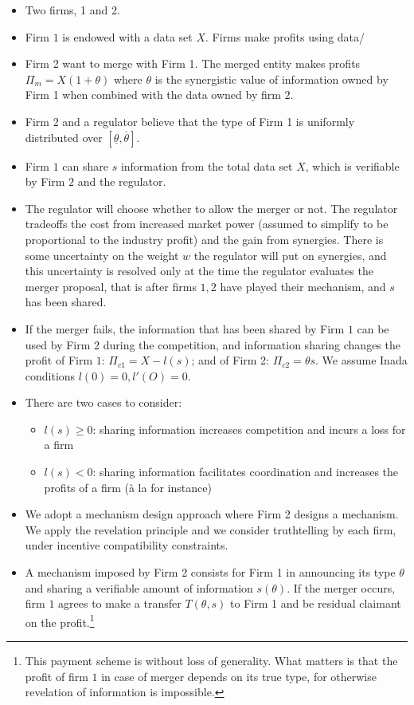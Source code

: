 \documentclass[a4paper]{article}
\renewcommand{\t}{\theta}
\begin{document}
\begin{itemize}
	\item Two firms, 1 and 2. 
	\item Firm $1$ is endowed with a data set $X$. Firms make profits using data/ 
	\item Firm 2 want to merge with Firm 1. The merged entity makes profits $\Pi_m=X(1+\t)$ where $\t$ is the synergistic value of information owned by Firm 1 when combined with the data owned by firm $2$. 
	\item Firm 2 and a regulator believe that the type of Firm 1 is uniformly distributed over $[\underline{\t},\overline{\t}]$.
    \item Firm $1$ can share $s$ information from the total data set $X$, which is verifiable by Firm $2$ and the regulator.
	\item The regulator will choose whether to allow the merger or not. The regulator tradeoffs the cost from increased market power (assumed to simplify to be proportional to the industry profit) and the gain from synergies. There is some uncertainty on the weight $w$ the regulator will put on synergies, and this uncertainty is resolved only at the time the regulator evaluates the merger proposal, that is after firms $1,2$ have played their mechanism, and $s$ has been shared.
	\item If the merger fails, the information that has been shared by Firm $1$ can be used by Firm 2 during the competition, and information sharing changes the profit of Firm $1$: $\Pi_{c1}=X-l(s)$; and of Firm 2: $\Pi_{c2}=\t s$. We assume Inada conditions $l(0)=0,l'(O)=0$.
	\item There are two cases to consider:
\begin{itemize}
    \item $l(s)\geq 0$: sharing information increases competition and incurs a loss for a firm
    \item $l(s)< 0$: sharing information facilitates coordination and increases the profits of a firm (à la \cite{vives1984duopoly} for instance)
 \end{itemize}
    \item We adopt a mechanism design approach where Firm 2 designs a mechanism. We apply the revelation principle and we consider truthtelling by each firm, under incentive compatibility constraints.
    \item A mechanism imposed by Firm 2 consists for Firm 1 in announcing its type $\t$ and sharing a verifiable amount of information $s(\t)$. If the merger occurs, firm $1$ agrees to make a transfer  $T(\t,s)$ to Firm 1 and be residual claimant on the profit.\footnote{%
    This payment scheme is without loss of generality. What matters is that the profit of firm $1$ in case of merger depends on its true type, for otherwise revelation of information is impossible.}
    
\end{itemize}
\end{document}
